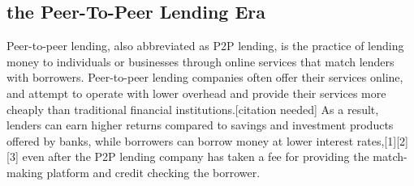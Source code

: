 \subsection*{ the Peer-To-Peer Lending Era }
Peer-to-peer lending, also abbreviated as P2P lending, is the practice of lending money to individuals or businesses through online services that match lenders with borrowers. Peer-to-peer lending companies often offer their services online, and attempt to operate with lower overhead and provide their services more cheaply than traditional financial institutions.[citation needed] As a result, lenders can earn higher returns compared to savings and investment products offered by banks, while borrowers can borrow money at lower interest rates,[1][2][3] even after the P2P lending company has taken a fee for providing the match-making platform and credit checking the borrower.


